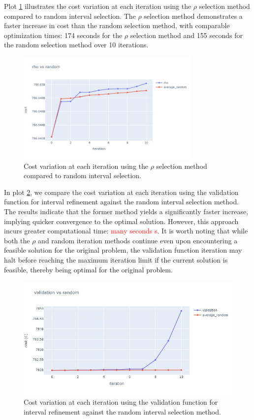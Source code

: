 {Plot \ref{fig:rho_vs_average} illustrates the cost variation at each iteration using the \(\rho\) selection method compared to random interval selection.
 The \(\rho\) selection method demonstrates a faster increase in cost than the random selection method, with comparable optimization times: 174 seconds for the \(\rho\) selection method 
 and 155 seconds for the random selection method over 10 iterations.
\begin{figure}[htbp]
  \centering
  \includegraphics[width=0.8\textwidth]{images/rho_vas_average2.png}
  \caption{Cost variation at each iteration using the \(\rho\) selection method compared to random interval selection.}
  \label{fig:rho_vs_average}
\end{figure}
In plot \ref{fig:val_vs_average}, we compare the cost variation at each iteration using the validation function for interval refinement against the random interval selection method. 
The results indicate that the former method yields a significantly faster increase, implying quicker convergence to the optimal solution. However, this approach incurs greater computational time: \textcolor{red}{many seconds s}. It is worth noting that while both the \(\rho\) and random iteration methods continue even upon encountering a feasible solution for the original problem, the validation function iteration may halt before reaching the maximum iteration limit if the current solution is feasible, thereby being optimal for the original problem.
\begin{figure}[htbp]
  \centering
  \includegraphics[width=\textwidth]{images/val_vs_average2.png}
  \caption{Cost variation at each iteration using the validation function for interval refinement against the random interval selection method.}
  \label{fig:val_vs_average}
\end{figure}


}

